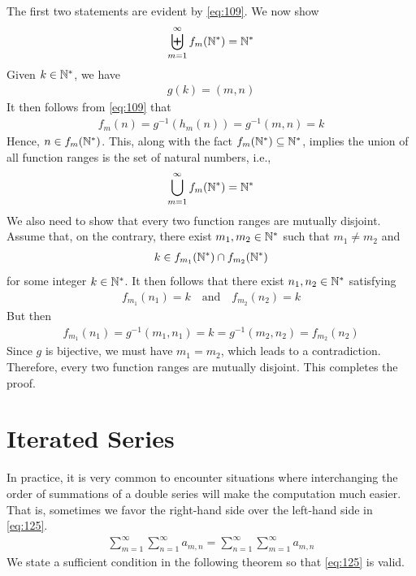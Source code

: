 \documentclass[thmcnt=section, 12pt]{my-elegantbook}
\begin{document}
\begin{solution}
    The first two statements are evident by \eqref{eq:109}. We now show 
    \begin{align*}
        \biguplus_{m=1}^\infty f_m(\mathbb{N}^\ast) = \mathbb{N}^\ast
    \end{align*}
    Given $k \in \mathbb{N}^\ast$, we have
    \begin{align*}
        g(k) = (m, n)
    \end{align*}
    It then follows from \eqref{eq:109} that 
    \begin{align*}
        f_m(n) = g^{-1}(h_m(n))
        = g^{-1}(m,n)
        = k
    \end{align*}
    Hence, $n \in f_m(\mathbb{N}^\ast)$. This, along with the fact $f_m(\mathbb{N}^\ast) \subseteq \mathbb{N}^\ast$, implies the union of all function ranges is the set of natural numbers, i.e., 
    \begin{align*}
        \bigcup_{m=1}^\infty f_m(\mathbb{N}^\ast) = \mathbb{N}^\ast
    \end{align*}
    We also need to show that every two function ranges are mutually disjoint. Assume that, on the contrary, there exist $m_1, m_2 \in \mathbb{N}^\ast$ such that $m_1 \neq m_2$ and
    \begin{align*}
        k \in f_{m_1}(\mathbb{N}^\ast) \cap f_{m_2}(\mathbb{N}^\ast)
    \end{align*}
    for some integer $k \in \mathbb{N}^\ast$. It then follows that there exist $n_1, n_2 \in \mathbb{N}^\ast$ satisfying
    \begin{align*}
        f_{m_1}(n_1) = k
        \quad \text{and} \quad
        f_{m_2}(n_2) = k
    \end{align*}
    But then
    \begin{align*}
        f_{m_1}(n_1) 
        = g^{-1}(m_1, n_1) 
        = k
        = g^{-1}(m_2, n_2)
        = f_{m_2}(n_2)
    \end{align*}
    Since $g$ is bijective, we must have $m_1 = m_2$, which leads to a contradiction. Therefore, every two function ranges are mutually disjoint. This completes the proof.
\end{solution}


\section{Iterated Series}

In practice, it is very common to encounter situations where interchanging the order of summations of a double series will make the computation much easier. That is, sometimes we favor the right-hand side over the left-hand side in \eqref{eq:125}.
\begin{align}
    \sum_{m=1}^\infty \sum_{n=1}^\infty a_{m,n}
    = \sum_{n=1}^\infty \sum_{m=1}^\infty a_{m,n}
    \label{eq:125}
\end{align}
We state a sufficient condition in the following theorem so that \eqref{eq:125} is valid.
\end{document}
